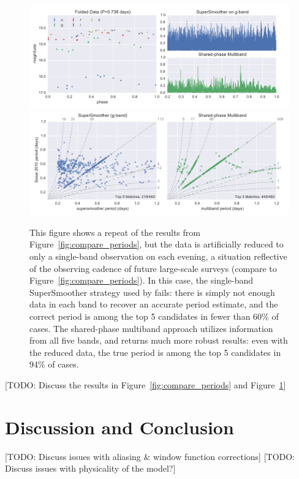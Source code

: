 \documentclass[12pt,preprint]{aastex}
\newcommand{\todo}[1]{{\color{red} [TODO: #1]}}
\newcommand{\Fig}[1]{Figure~\ref{fig:#1}}
\newcommand{\fig}[1]{\Fig{#1}}
\newcommand{\figlabel}[1]{\label{fig:#1}}
\begin{document}
\begin{figure}
  \centering
  \includegraphics[width=\textwidth]{fig08a.pdf}
  \includegraphics[width=\textwidth]{fig08b.pdf}
  \caption{
    This figure shows a repeat of the results from \fig{compare_periods}, but the data is artificially reduced to only a single-band observation on each evening, a situation reflective of the observing cadence of future large-scale surveys (compare to \fig{compare_periods}).
    In this case, the single-band SuperSmoother strategy used by \citet{Sesar2010} fails: there is simply not enough data in each band to recover an accurate period estimate, and the correct period is among the top 5 candidates in fewer than 60\% of cases.
    The shared-phase multiband approach utilizes information from all five bands, and returns much more robust results: even with the reduced data, the true period is among the top 5 candidates in 94\% of cases.
  } 
  \figlabel{compare_periods_partial}
\end{figure}

\todo{Discuss the results in \fig{compare_periods} and \fig{compare_periods_partial}} 

\section{Discussion and Conclusion}

\todo{Discuss issues with aliasing \& window function corrections}
\todo{Discuss issues with physicality of the model?}





\end{document}
